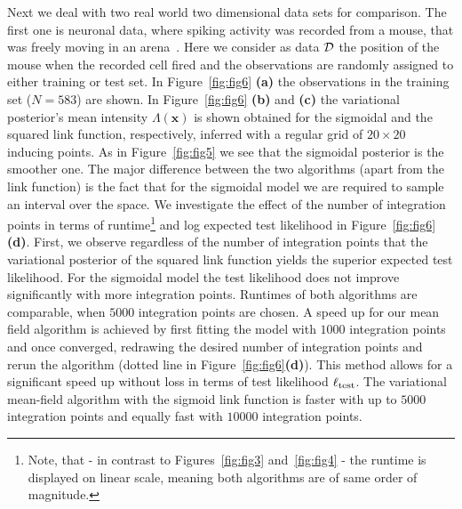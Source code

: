 \documentclass[twoside,11pt]{article}
\newcommand{\dataset}{{\cal D}}
\newcommand{\bx}{\boldsymbol{x}}
\begin{document}
Next we deal with two real world two dimensional data sets for comparison. The first one is neuronal data, where spiking activity was recorded from a mouse, that was freely moving in an arena~\citep{gridcelldata,sargolini06}. Here we consider as data $\dataset$ the position of the mouse when the recorded cell fired and the observations are randomly assigned to either training or test set. In Figure~\ref{fig:fig6} {\bf(a)} the observations in the training set ($N=583$) are shown. In Figure~\ref{fig:fig6} {\bf (b)} and {\bf (c)} the variational posterior's mean intensity $\Lambda(\bx)$ is shown obtained for the sigmoidal and the squared link function, respectively, inferred with a regular grid of $20\times 20$ inducing points. As in Figure~\ref{fig:fig5} we see that the sigmoidal posterior is the smoother one. The major difference between the two algorithms (apart from the link function) is the fact that for the sigmoidal model we are required to sample an interval over the space. We investigate the effect of the number of integration points in terms of runtime\footnote{Note, that - in contrast to Figures~\ref{fig:fig3} and~\ref{fig:fig4} - the runtime is displayed on linear scale, meaning both algorithms are of same order of magnitude.} and log expected test likelihood in Figure~\ref{fig:fig6} {\bf (d)}. First, we observe regardless of the number of integration points that the variational posterior of the squared link function yields the superior expected test likelihood. For the sigmoidal model the test likelihood does not improve significantly with more integration points. Runtimes of both algorithms are comparable, when $5000$ integration points are chosen. A speed up for our mean field algorithm is achieved by first fitting the model with $1000$ integration points and once converged, redrawing the desired number of integration points and rerun the algorithm (dotted line in Figure~\ref{fig:fig6}{\bf (d)}). This method allows for a significant speed up without loss in terms of test likelihood $\ell_{\rm test}$. The variational mean-field algorithm with the sigmoid link function is faster with up to $5000$ integration points and equally fast with $10000$ integration points.
\end{document}
